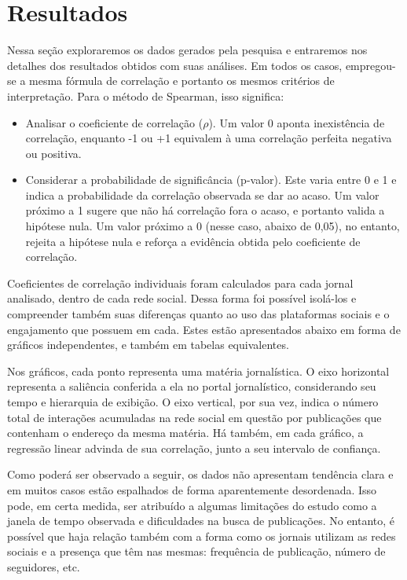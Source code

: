 \documentclass[
	12pt,
	oneside,
	a4paper,
	english,
	brazil
]{abntex2ppgsi}
\begin{document}
\chapter{Resultados}
Nessa seção exploraremos os dados gerados pela pesquisa e entraremos nos detalhes dos resultados obtidos com suas análises. 
Em todos os casos, empregou-se a mesma fórmula de correlação e portanto os mesmos critérios de interpretação. Para o método de Spearman, isso significa:
\begin{itemize}
    \item Analisar o coeficiente de correlação ($\rho$). Um valor 0 aponta inexistência de correlação, enquanto -1 ou +1 equivalem à uma correlação perfeita negativa ou positiva.
    \item Considerar a probabilidade de significância (p-valor). Este varia entre 0 e 1 e indica a probabilidade da correlação observada se dar ao acaso. Um valor próximo a 1 sugere que não há correlação fora o acaso, e portanto valida a hipótese nula. Um valor próximo a 0 (nesse caso, abaixo de 0,05), no entanto, rejeita a hipótese nula e reforça a evidência obtida pelo coeficiente de correlação.
\end{itemize}

Coeficientes de correlação individuais foram calculados para cada jornal analisado, dentro de cada rede social. Dessa forma foi possível isolá-los e compreender também suas diferenças quanto ao uso das plataformas sociais e o engajamento que possuem em cada. Estes estão apresentados abaixo em forma de gráficos independentes, e também em tabelas equivalentes.

Nos gráficos, cada ponto representa uma matéria jornalística. O eixo horizontal representa a saliência conferida a ela no portal jornalístico, considerando seu tempo e hierarquia de exibição. O eixo vertical, por sua vez, indica o número total de interações acumuladas na rede social em questão por publicações que contenham o endereço da mesma matéria. Há também, em cada gráfico, a regressão linear advinda de sua correlação, junto a seu intervalo de confiança.

Como poderá ser observado a seguir, os dados não apresentam tendência clara e em muitos casos estão espalhados de forma aparentemente desordenada. Isso pode, em certa medida, ser atribuído a algumas limitações do estudo como a janela de tempo observada e dificuldades na busca de publicações. No entanto, é possível que haja relação também com a forma como os jornais utilizam as redes sociais e a presença que têm nas mesmas: frequência de publicação, número de seguidores, etc.
\end{document}
